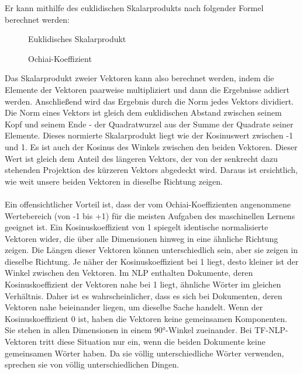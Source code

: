 Er kann mithilfe des euklidischen Skalarprodukts nach folgender Formel berechnet werden:
\begin{figure}[H]
    \centering
    \caption{\label{figure:Euklidisches_Skalarprodukt}Euklidisches Skalarprodukt}
\end{figure}
\noindent
\begin{figure}[H]
    \centering
    \caption{\label{figure:Ochiai_Koeffizient}Ochiai-Koeffizient}
\end{figure}
\noindent
Das Skalarprodukt zweier Vektoren kann also berechnet werden, indem die Elemente der Vektoren paarweise multipliziert und dann die Ergebnisse addiert werden. 
Anschließend wird das Ergebnis durch die Norm jedes Vektors dividiert. 
Die Norm eines Vektors ist gleich dem euklidischen Abstand zwischen seinem Kopf und seinem Ende - der Quadratwurzel aus der Summe der Quadrate seiner Elemente. 
Dieses normierte Skalarprodukt liegt wie der Kosinuswert zwischen -1 und 1. 
Es ist auch der Kosinus des Winkels zwischen den beiden Vektoren. 
Dieser Wert ist gleich dem Anteil des längeren Vektors, der von der senkrecht dazu stehenden Projektion des kürzeren Vektors abgedeckt wird. 
Daraus ist ersichtlich, wie weit unsere beiden Vektoren in dieselbe Richtung zeigen.\\\\
Ein offensichtlicher Vorteil ist, dass der vom Ochiai-Koeffizienten angenommene Wertebereich (von -1 bis +1) für die meisten Aufgaben des maschinellen Lernens geeignet ist. 
Ein Kosinuskoeffizient von 1 spiegelt identische normalisierte Vektoren wider, die über alle Dimensionen hinweg in eine ähnliche Richtung zeigen. 
Die Längen dieser Vektoren können unterschiedlich sein, aber sie zeigen in dieselbe Richtung. 
Je näher der Kosinuskoeffizient bei 1 liegt, desto kleiner ist der Winkel zwischen den Vektoren. 
Im \ac{NLP} enthalten Dokumente, deren Kosinuskoeffizient der Vektoren nahe bei 1 liegt, ähnliche Wörter im gleichen Verhältnis. 
Daher ist es wahrscheinlicher, dass es sich bei Dokumenten, deren Vektoren nahe beieinander liegen, um dieselbe Sache handelt. 
Wenn der Kosinuskoeffizient 0 ist, haben die Vektoren keine gemeinsamen Komponenten. 
Sie stehen in allen Dimensionen in einem 90°-Winkel zueinander. 
Bei \ac{TF}-\ac{NLP}-Vektoren tritt diese Situation nur ein, wenn die beiden Dokumente keine gemeinsamen Wörter haben. 
Da sie völlig unterschiedliche Wörter verwenden, sprechen sie von völlig unterschiedlichen Dingen. 

